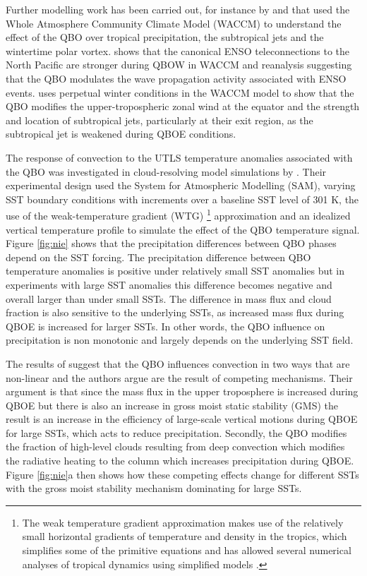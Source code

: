 Further modelling work has been carried out, for instance by \cite{garfinkel2010} and \cite{garfinkel2011} that used the Whole Atmosphere Community Climate Model (WACCM) to understand the effect of the QBO over tropical precipitation, the subtropical jets and the wintertime polar vortex. \cite{garfinkel2010} shows that the canonical ENSO teleconnections to the North Pacific are stronger during QBOW in WACCM and reanalysis suggesting that the QBO modulates the wave propagation activity associated with ENSO events.
 \cite{garfinkel2011} uses perpetual winter conditions in the WACCM model to show that the QBO modifies the upper-tropospheric zonal wind at the equator and the strength and location of subtropical jets, particularly at their exit region, as the subtropical jet is weakened during QBOE conditions.

 The response of convection to the UTLS temperature anomalies associated with the QBO was investigated in cloud-resolving model simulations by \cite{nie2015}. Their experimental design used the System for Atmospheric Modelling (SAM), varying SST boundary conditions with increments over a baseline SST level of 301 K, the use of the weak-temperature gradient (WTG) \footnote{The weak temperature gradient approximation makes use of the relatively small horizontal gradients of temperature and density in the tropics, which simplifies some of the primitive equations and has allowed several numerical analyses of tropical dynamics using simplified models \citep{sobel2001wtg}.} approximation and an idealized vertical temperature profile to simulate the effect of the QBO temperature signal. 
 Figure \ref{fig:nie} shows that the precipitation differences between QBO phases depend on the SST forcing.   The precipitation difference between QBO temperature anomalies is positive under relatively small SST anomalies but in experiments with large SST anomalies this difference becomes negative and overall larger than under small SSTs. The difference in mass flux and cloud fraction is also sensitive to the underlying SSTs, as increased mass flux during QBOE is increased for larger SSTs.  In other words, the QBO influence on precipitation is non monotonic and largely depends on the underlying SST field.
 
  The results of \cite{nie2015} suggest that the QBO influences convection in two ways that are non-linear and the authors argue are the result of competing mechanisms. Their argument is that since  the mass flux in the upper troposphere is increased during QBOE but there is also an increase in gross moist static stability (GMS) the result is an increase in the efficiency of large-scale vertical motions during QBOE for large SSTs, which acts to reduce precipitation.  Secondly, the QBO modifies the fraction of high-level clouds resulting from deep convection which modifies the radiative heating to the column which increases precipitation during QBOE.  Figure \ref{fig:nie}a then shows how these competing effects change for different SSTs with the gross moist stability mechanism dominating for large SSTs.

